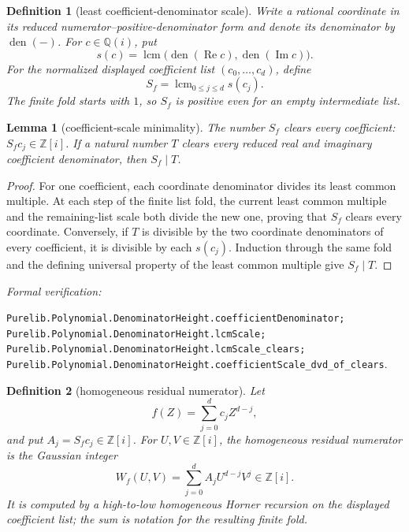 \documentclass[11pt]{article}
\newtheorem{lemma}[lemma]{Lemma}
\newtheorem{definition}[definition]{Definition}
\newcommand{\Qi}{\mathbb{Q}(i)}
\newcommand{\Zi}{\mathbb{Z}[i]}
\newcommand{\Ree}{\operatorname{Re}}
\newcommand{\Imm}{\operatorname{Im}}
\newcommand{\leanref}[1]{\par\smallskip\noindent
  \emph{Formal verification:}\par\nobreak
  {\raggedright\nolinkurl{#1}.\par}}
\begin{document}
\begin{definition}[least coefficient-denominator scale]
\label{def:least-coefficient-scale}
Write a rational coordinate in its reduced numerator--positive-denominator
form and denote its denominator by $\operatorname{den}(-)$.  For
$c\in\Qi$, put
\[
 s(c)=\operatorname{lcm}\bigl(\operatorname{den}(\Ree c),
                              \operatorname{den}(\Imm c)\bigr).
\]
For the normalized displayed coefficient list $(c_0,\ldots,c_d)$, define
\begin{equation}
\label{eq:least-coefficient-scale}
                     S_f=\operatorname{lcm}_{0\le j\le d}s(c_j).
\end{equation}
The finite fold starts with $1$, so $S_f$ is positive even for an empty
intermediate list.
\end{definition}

\begin{lemma}[coefficient-scale minimality]
\label{lem:coefficient-scale-minimal}
The number $S_f$ clears every coefficient: $S_fc_j\in\Zi$.  If a natural
number $T$ clears every reduced real and imaginary coefficient denominator,
then $S_f\mid T$.
\end{lemma}

\begin{proof}
For one coefficient, each coordinate denominator divides its least common
multiple.  At each step of the finite list fold, the current least common
multiple and the remaining-list scale both divide the new one, proving that
$S_f$ clears every coordinate.  Conversely, if $T$ is divisible by the two
coordinate denominators of every coefficient, it is divisible by each
$s(c_j)$.  Induction through the same fold and the defining universal
property of the least common multiple give $S_f\mid T$.
\end{proof}

\leanref{Purelib.Polynomial.DenominatorHeight.coefficientDenominator;
Purelib.Polynomial.DenominatorHeight.lcmScale;
Purelib.Polynomial.DenominatorHeight.lcmScale_clears;
Purelib.Polynomial.DenominatorHeight.coefficientScale_dvd_of_clears}

\begin{definition}[homogeneous residual numerator]
\label{def:homogeneous-numerator}
Let
\[
 f(Z)=\sum_{j=0}^{d}c_jZ^{d-j},
\]
and put $A_j=S_fc_j\in\Zi$.  For $U,V\in\Zi$, the \emph{homogeneous residual
numerator} is the Gaussian integer
\begin{equation}
\label{eq:homogeneous-numerator}
 W_f(U,V)=\sum_{j=0}^{d}A_jU^{d-j}V^j\in\Zi.
\end{equation}
It is computed by a high-to-low homogeneous Horner recursion on the displayed
coefficient list; the sum is notation for the resulting finite fold.
\end{definition}
\end{document}
